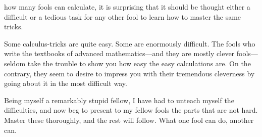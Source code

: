 

     how many fools can calculate, it is
    surprising that it should be thought either a difficult
    or a tedious task for any other fool to learn how to
    master the same tricks.
    
    Some calculus-tricks are quite easy. Some are
    enormously difficult. The fools who write the textbooks
    of advanced mathematics---and they are mostly
    clever fools---seldom take the trouble to show you how
    easy the easy calculations are. On the contrary, they
    seem to desire to impress you with their tremendous
    cleverness by going about it in the most difficult way.
    
    Being myself a remarkably stupid fellow, I have
    had to unteach myself the difficulties, and now beg
    to present to my fellow fools the parts that are not
    hard. Master these thoroughly, and the rest will
    follow. What one fool can do, another can.
    \mainmatter
    